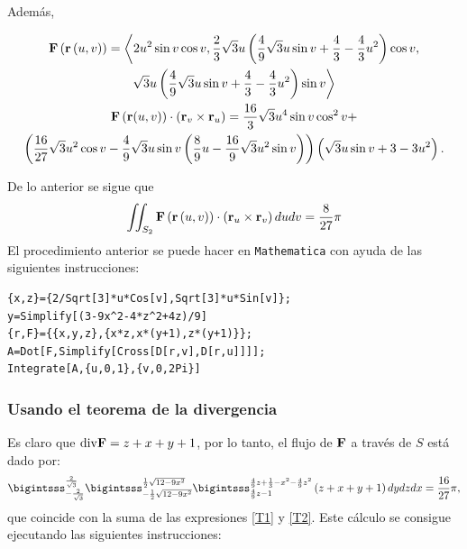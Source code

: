 Además,
\begin{small}
\begin{multline*}
{\bf F}\left( {\bf r}\left( u,v\right) \right) = \bigg\langle 2u^{2}\sin v\cos v,
\frac{2}{3}\sqrt{3}u\left( \frac{4}{9}\sqrt{3}u\sin v+\frac{4}{3}- \frac{4}{3}u^{2}\right) \cos v, \\
\sqrt{3}u\left( \frac{4}{9}\sqrt{3}u\sin v+\frac{4}{3}-\frac{4}{3}u^{2}\right) \sin v\bigg\rangle\\
{\bf F}\left({\bf r}(u,v) \right) \cdot \left( {\bf r}_{v}\times {\bf r}_{u}\right) =
\frac{16}{3}\sqrt{3}u^{4}\sin v\cos ^{2}v+ \\
\left( \frac{16}{27}\sqrt{3}u^{2}\cos v - \frac{4}{9}\sqrt{3}u\sin v \left( \frac{8}{9}u-\frac{16}{9}\sqrt{3}u^{2}\sin v\right) \right) \left( \sqrt{3}u\sin v+3-3u^{2}\right).
\end{multline*}
\end{small}

De lo anterior se sigue que
\begin{equation} \label{T2}
\iint_{S_2}{\bf F}\left( {\bf r}\left( u,v\right) \right) \cdot \left( {\bf r}_{u}\times {\bf r}_{v}\right)dudv=\frac{8}{27}\pi
\end{equation}
El procedimiento anterior se puede hacer en \verb"Mathematica" con ayuda de las siguientes instrucciones:

\begin{tcolorbox}[title=\bf Instrucción \verb"Mathematica"]\begin{Verbatim}[formatcom=\letraverbatim]
{x,z}={2/Sqrt[3]*u*Cos[v],Sqrt[3]*u*Sin[v]};
y=Simplify[(3-9x^2-4*z^2+4z)/9]
{r,F}={{x,y,z},{x*z,x*(y+1),z*(y+1)}};
A=Dot[F,Simplify[Cross[D[r,v],D[r,u]]]];
Integrate[A,{u,0,1},{v,0,2Pi}]
\end{Verbatim}
\end{tcolorbox}

\subsubsection{Usando el teorema de la divergencia}

Es claro que ${\rm div}{\bf F}=z+x+y+1$, por lo tanto, el flujo de ${\bf F}$ a través de $S$ está dado por:
\[\bigintsss_{-\frac{2}{\sqrt{3}}}^{\frac{2}{\sqrt{3}}}\bigintsss_{-\frac{1}{2}\sqrt{12-9x^{2}}}^{\frac{1}{2}\sqrt{12-9x^{2}}}\bigintsss_{\frac{4}{9}z-1}^{\frac{4}{9}z+ \frac{1}{3}-x^{2}-\frac{4}{9}z^{2}}\left( z+x+y+1\right) dydzdx=\frac{16}{27}\pi,\]
que coincide con la suma de las expresiones \ref{T1} y \ref{T2}.
Este cálculo se consigue ejecutando las siguientes instrucciones:

